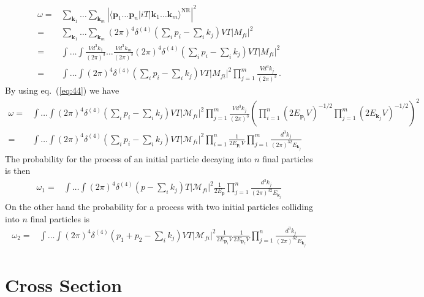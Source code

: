 \begin{align}
  \label{eq:48}
\omega=&\sum_{\mathbf{k}_1}\ldots\sum_{\mathbf{k}_m}\left|
    \langle\mathbf{p}_1\ldots\mathbf{p}_n|i T|\mathbf{k}_1\ldots\mathbf{k}_m\rangle^{\text{NR}}\right|^2\nonumber\\
  =&\sum_{\mathbf{k}_1}\ldots\sum_{\mathbf{k}_m}(2\pi)^4\delta^{(4)}\left(\sum_i p_i-\sum_i k_j\right)V T  
  \left|{M}_{fi}\right|^2\nonumber\\
  =&\int\ldots\int \frac{Vd^3k_1}{(2\pi)^3}\ldots\frac{Vd^3k_m}{(2\pi)^3} 
(2\pi)^4\delta^{(4)}\left(\sum_i p_i-\sum_i k_j\right)V T \left|{M}_{fi}\right|^2\nonumber\\
=&\int\ldots\int 
(2\pi)^4\delta^{(4)}\left(\sum_i p_i-\sum_i k_j\right)V T \left|{M}_{fi}\right|^2
 \prod_{j=1}^m\frac{Vd^3k_j}{(2\pi)^3}\,.
\end{align}
By using eq.~(\ref{eq:44}) we have
\begin{align}
  \omega=&\int\ldots\int 
(2\pi)^4\delta^{(4)}\left(\sum_i p_i-\sum_i k_j\right)V T 
\left|\mathcal{M}_{fi}\right|^2
\prod_{j=1}^m\frac{Vd^3k_j}{(2\pi)^3}
\left(\prod_{i=1}^{n}\left(2E_{\mathbf{p}_i}V\right)^{-1/2}
\prod_{j=1}^{m}\left(2E_{\mathbf{k}_j}V\right)^{-1/2}\right)^2\nonumber\\
=&\int\ldots\int 
(2\pi)^4\delta^{(4)}\left(\sum_i p_i-\sum_i k_j\right)V T 
\left|\mathcal{M}_{fi}\right|^2
\prod_{i=1}^{n}\frac{1}{2E_{\mathbf{p}_i}V}
\prod_{j=1}^m\frac{d^3k_j}{(2\pi)^32E_{\mathbf{k}_j}}
\end{align}
The probability for the process of an initial particle decaying into $n$ final particles is then
\begin{align}
\label{eq:146}
 \omega_1 =&\int\ldots\int 
(2\pi)^4\delta^{(4)}\left(p-\sum_i k_j\right)T 
\left|\mathcal{M}_{fi}\right|^2
\frac{1}{2E_{\mathbf{p}}}
\prod_{j=1}^n\frac{d^3k_j}{(2\pi)^32E_{\mathbf{k}_j}}
\end{align}
On the other hand the probability for a process with two initial particles colliding into $n$ final particles is
\begin{align}
\label{eq:w2}
 \omega_2 =&\int\ldots\int 
(2\pi)^4\delta^{(4)}\left(p_1+p_2-\sum_i k_j\right)VT 
\left|\mathcal{M}_{fi}\right|^2
\frac{1}{2E_{\mathbf{p}_1}V}\frac{1}{2E_{\mathbf{p}_2}V}
\prod_{j=1}^n\frac{d^3k_j}{(2\pi)^32E_{\mathbf{k}_j}}
\end{align}


\section{Cross Section}
\label{sec:cross-section}

